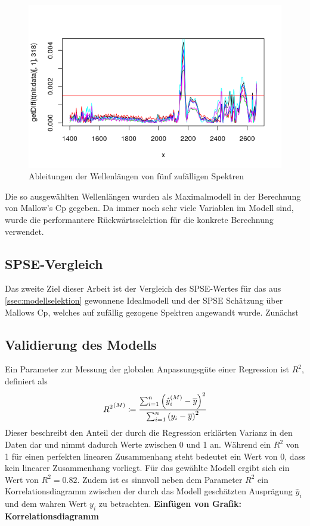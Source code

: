 	\begin{figure}
		\label{Wellenlängen_erste_Ableitung}
		\includegraphics[width=\textwidth]{img/wave_1dev.png}
		\caption{Ableitungen der Wellenlängen von fünf zufälligen Spektren}
	\end{figure}

	Die so ausgewählten Wellenlängen wurden als Maximalmodell in der Berechnung von Mallow's Cp gegeben. Da immer noch sehr viele Variablen im Modell sind, wurde die performantere Rückwärtsselektion für die konkrete Berechnung verwendet.

	\subsection{SPSE-Vergleich}
	Das zweite Ziel dieser Arbeit ist der Vergleich des SPSE-Wertes für das aus \ref{ssec:modellselektion} gewonnene Idealmodell und der SPSE Schätzung über Mallows Cp, welches auf zufällig gezogene Spektren angewandt wurde.
	Zunächst



	\subsection{Validierung des Modells}
	\label{ssec:model-validation}
	   Ein Parameter zur Messung der globalen Anpassungsgüte einer Regression ist $R^2$, definiert als \cite{Lang2007}
		\[
			{R^2}^{(M)} \coloneqq \frac {\sum_{i=1}^n \left( \hat{y}^{(M)}_i - \overline{y} \right)^2}{\sum_{i=1}^n \left( y_i - \overline{y} \right)^2}
		\]
		Dieser beschreibt den Anteil der durch die Regression erklärten Varianz in den Daten dar und nimmt dadurch Werte zwischen 0 und 1 an.
		Während ein $R^2$ von 1 für einen perfekten linearen Zusammenhang steht bedeutet ein Wert von 0, dass kein linearer Zusammenhang vorliegt.
		Für das gewählte Modell ergibt sich ein Wert von $R^2 =  0.82$.
		Zudem ist es sinnvoll neben dem Parameter $R^2$ ein Korrelationsdiagramm zwischen der durch das Modell geschätzten Ausprägung $\hat{y}_i$ und dem wahren Wert $y_i$ zu betrachten.
		\textbf{Einfügen von Grafik: Korrelationsdiagramm}

